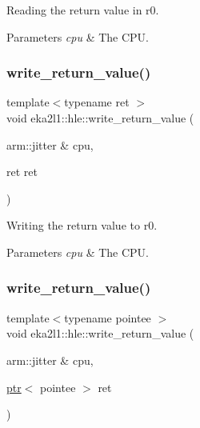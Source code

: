 Reading the return value in r0. 


\begin{DoxyParams}{Parameters}
{\em cpu} & The C\+PU. \\
\hline
\end{DoxyParams}
\mbox{\label{namespaceeka2l1_1_1hle_ae6e670dc04b65bf275586cd1e5183d2b}} 
\subsubsection{\texorpdfstring{write\+\_\+return\+\_\+value()}{write\_return\_value()}\hspace{0.1cm}{\footnotesize\ttfamily [1/2]}}
{\footnotesize\ttfamily template$<$typename ret $>$ \\
void eka2l1\+::hle\+::write\+\_\+return\+\_\+value (\begin{DoxyParamCaption}\item[{arm\+::jitter \&}]{cpu,  }\item[{ret}]{ret }\end{DoxyParamCaption})}



Writing the return value to r0. 


\begin{DoxyParams}{Parameters}
{\em cpu} & The C\+PU. \\
\hline
\end{DoxyParams}
\mbox{\label{namespaceeka2l1_1_1hle_a4459527ec360342d62e8cb01de2634f4}} 
\subsubsection{\texorpdfstring{write\+\_\+return\+\_\+value()}{write\_return\_value()}\hspace{0.1cm}{\footnotesize\ttfamily [2/2]}}
{\footnotesize\ttfamily template$<$typename pointee $>$ \\
void eka2l1\+::hle\+::write\+\_\+return\+\_\+value (\begin{DoxyParamCaption}\item[{arm\+::jitter \&}]{cpu,  }\item[{\mbox{\hyperlink{classeka2l1_1_1ptr}{ptr}}$<$ pointee $>$}]{ret }\end{DoxyParamCaption})}




